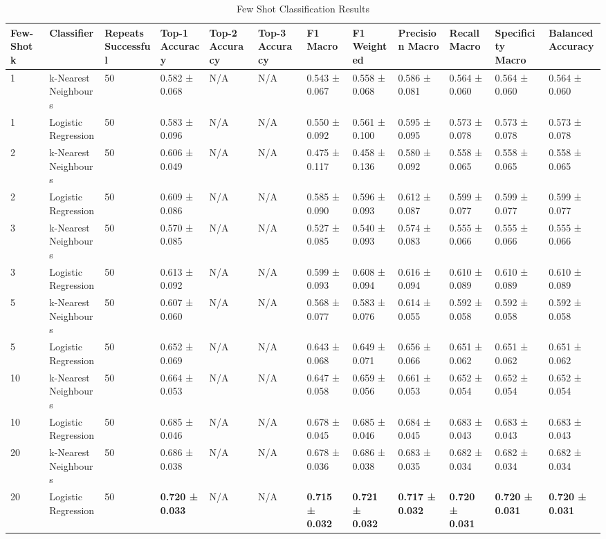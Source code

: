 
\begin{table}[ht]
\centering
\tiny  %
\caption{Few Shot Classification Results}
\label{tab:few_shotclassification_results}
\begin{tabularx}{\textwidth}{lXXXXXXXXXXX}
\toprule
Few-Shot k & Classifier & Repeats Successful & Top-1 Accuracy & Top-2 Accuracy & Top-3 Accuracy & F1 Macro & F1 Weighted & Precision Macro & Recall Macro & Specificity Macro & Balanced Accuracy \\
\midrule
1 & k-Nearest Neighbours & 50 & 0.582 ± 0.068 & N/A & N/A & 0.543 ± 0.067 & 0.558 ± 0.068 & 0.586 ± 0.081 & 0.564 ± 0.060 & 0.564 ± 0.060 & 0.564 ± 0.060 \\
1 & Logistic Regression & 50 & 0.583 ± 0.096 & N/A & N/A & 0.550 ± 0.092 & 0.561 ± 0.100 & 0.595 ± 0.095 & 0.573 ± 0.078 & 0.573 ± 0.078 & 0.573 ± 0.078 \\
2 & k-Nearest Neighbours & 50 & 0.606 ± 0.049 & N/A & N/A & 0.475 ± 0.117 & 0.458 ± 0.136 & 0.580 ± 0.092 & 0.558 ± 0.065 & 0.558 ± 0.065 & 0.558 ± 0.065 \\
2 & Logistic Regression & 50 & 0.609 ± 0.086 & N/A & N/A & 0.585 ± 0.090 & 0.596 ± 0.093 & 0.612 ± 0.087 & 0.599 ± 0.077 & 0.599 ± 0.077 & 0.599 ± 0.077 \\
3 & k-Nearest Neighbours & 50 & 0.570 ± 0.085 & N/A & N/A & 0.527 ± 0.085 & 0.540 ± 0.093 & 0.574 ± 0.083 & 0.555 ± 0.066 & 0.555 ± 0.066 & 0.555 ± 0.066 \\
3 & Logistic Regression & 50 & 0.613 ± 0.092 & N/A & N/A & 0.599 ± 0.093 & 0.608 ± 0.094 & 0.616 ± 0.094 & 0.610 ± 0.089 & 0.610 ± 0.089 & 0.610 ± 0.089 \\
5 & k-Nearest Neighbours & 50 & 0.607 ± 0.060 & N/A & N/A & 0.568 ± 0.077 & 0.583 ± 0.076 & 0.614 ± 0.055 & 0.592 ± 0.058 & 0.592 ± 0.058 & 0.592 ± 0.058 \\
5 & Logistic Regression & 50 & 0.652 ± 0.069 & N/A & N/A & 0.643 ± 0.068 & 0.649 ± 0.071 & 0.656 ± 0.066 & 0.651 ± 0.062 & 0.651 ± 0.062 & 0.651 ± 0.062 \\
10 & k-Nearest Neighbours & 50 & 0.664 ± 0.053 & N/A & N/A & 0.647 ± 0.058 & 0.659 ± 0.056 & 0.661 ± 0.053 & 0.652 ± 0.054 & 0.652 ± 0.054 & 0.652 ± 0.054 \\
10 & Logistic Regression & 50 & 0.685 ± 0.046 & N/A & N/A & 0.678 ± 0.045 & 0.685 ± 0.046 & 0.684 ± 0.045 & 0.683 ± 0.043 & 0.683 ± 0.043 & 0.683 ± 0.043 \\
20 & k-Nearest Neighbours & 50 & 0.686 ± 0.038 & N/A & N/A & 0.678 ± 0.036 & 0.686 ± 0.038 & 0.683 ± 0.035 & 0.682 ± 0.034 & 0.682 ± 0.034 & 0.682 ± 0.034 \\
20 & Logistic Regression & 50 & \textbf{0.720 ± 0.033} & N/A & N/A & \textbf{0.715 ± 0.032} & \textbf{0.721 ± 0.032} & \textbf{0.717 ± 0.032} & \textbf{0.720 ± 0.031} & \textbf{0.720 ± 0.031} & \textbf{0.720 ± 0.031} \\
\bottomrule
\bottomrule
\end{tabularx}
\end{table}
